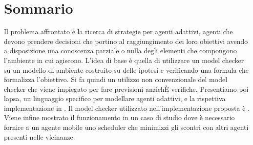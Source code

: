 \renewcommand{\abstractname}{Sommario}
\begingroup
\let\clearpage\relax
\let\cleardoublepage\relax
\let\cleardoublepage\relax

\chapter*{Sommario}
Il problema affrontato è la ricerca di strategie per agenti adattivi, agenti che devono prendere decisioni che portino al raggiungimento dei loro obiettivi avendo a disposizione una conoscenza parziale o nulla degli elementi che compongono l'ambiente in cui agiscono. L'idea di base è quella di utilizzare un model checker su un modello di ambiente costruito su delle ipotesi e verificando una formula che formalizza l'obiettivo. Si fa quindi un utilizzo non convenzionale del model checker che viene impiegato per fare previsioni anzichÈ verifiche. Presentiamo poi \acl{lapsa}, un linguaggio specifico per modellare agenti adattivi, e la rispettiva implementazione in \xtext{}. Il model checker utilizzato nell'implementazione proposta è \prism{}. Viene infine mostrato il funzionamento in un caso di studio dove è necessario fornire a un agente mobile uno scheduler che minimizzi gli scontri con altri agenti presenti nelle vicinanze.
\endgroup			

\vfill